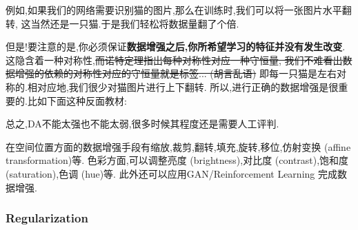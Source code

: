 例如,如果我们的网络需要识别猫的图片,那么在训练时,我们可以将一张图片水平翻转,
这当然还是一只猫.于是我们轻松将数据量翻了个倍.

但是!要注意的是,你必须保证\textbf{数据增强之后,你所希望学习的特征并没有发生改变}.
这隐含着一种对称性,\sout{而诺特定理指出每种对称性对应一种守恒量,
我们不难看出数据增强的依赖的对称性对应的守恒量就是标签... (胡言乱语)}
即每一只猫是左右对称的.相对应地,我们很少对猫图片进行上下翻转.
所以,进行正确的数据增强是很重要的.比如下面这种反面教材:

\begin{figure}[htbp]
	\centering
\end{figure}

总之,DA不能太强也不能太弱,很多时候其程度还是需要人工评判.

在空间位置方面的数据增强手段有缩放,裁剪,翻转,填充,旋转,移位,仿射变换 (affine transformation)等.
色彩方面,可以调整亮度 (brightness),对比度 (contrast),饱和度 (saturation),色调 (hue)等.
此外还可以应用GAN/Reinforcement Learning 完成数据增强.

\subsubsection{Regularization}

